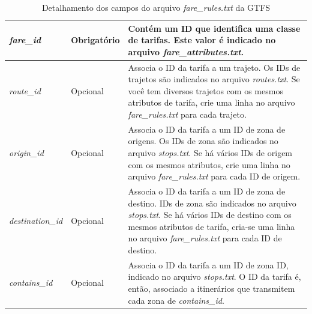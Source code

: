 \documentclass[
	12pt,				%
	oneside,			%
	a4paper,			%
	english,			%
	brazil				%
	]{abntex2ppgsi}
\begin{document}
{{\begin{apendicesenv}
\begin{table}
\caption{Detalhamento dos campos do arquivo \textit{fare\_rules.txt} da GTFS}
      \label{tab:gtfsFareRules}
\begin{tabular}[!htb]{>{\centering\arraybackslash}m{3.8cm} | >{\centering}m{2.5cm} | >{\centering\arraybackslash}m{8.5cm}}
\hline 
\textit{fare\_id} & Obrigatório & Contém um ID que identifica uma classe de tarifas. Este valor é indicado no arquivo \textit{fare\_attributes.txt}. \\
\hline 
\textit{route\_id} & Opcional & Associa o ID da tarifa a um trajeto. Os IDs de trajetos são indicados no arquivo \textit{routes.txt}. Se você tem diversos trajetos com os mesmos atributos de tarifa, crie uma linha no arquivo \textit{fare\_rules.txt} para cada trajeto. \\
\hline 
\textit{origin\_id} & Opcional & Associa o ID da tarifa a um ID de zona de origens. Os IDs de zona são indicados no arquivo \textit{stops.txt}. Se há vários IDs de origem com os mesmos atributos, crie uma linha no arquivo \textit{fare\_rules.txt} para cada ID de origem. \\
\hline 
\textit{destination\_id} & Opcional & Associa o ID da tarifa a um ID de zona de destino. IDs de zona são indicados no arquivo \textit{stops.txt}. Se há vários IDs de destino com os mesmos atributos de tarifa, cria-se uma linha no arquivo \textit{fare\_rules.txt} para cada ID de destino. \\
\hline 
\textit{contains\_id} & Opcional & Associa o ID da tarifa a um ID de zona ID, indicado no arquivo \textit{stops.txt}. O ID da tarifa é, então, associado a itinerários que transmitem cada zona de \textit{contains\_id}.\\
\hline 
\end{tabular}
\end{table}
\vspace{-\baselineskip}

\clearpage


\end{apendicesenv}}}
\end{document}
